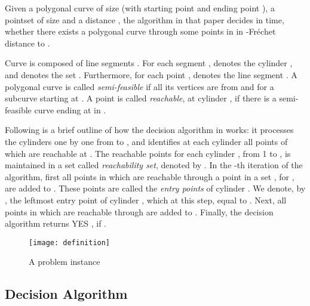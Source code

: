\documentclass[a4paper,UKenglish]{lipics}
\newcommand{\Frechet}{Fr\'echet }
\begin{document}
\vspace{0.3 in}

Given a polygonal curve  of size  (with 
starting point  and ending point ), 
a pointset  of size 
and a distance , 
the algorithm in that paper decides in  time,
whether there exists a polygonal curve through some points 
in  in -\Frechet distance to 
. 

Curve  is composed of  
line segments . 
For each segment ,
 denotes the cylinder ,
and  denotes the set .
Furthermore, for each point ,
  denotes the line segment  \cite{cccg11}.
A polygonal curve  is called \emph{semi-feasible} if all its vertices are from  and 
 for a subcurve   starting at .
A point  is called \emph{reachable}, at cylinder ,
if there is a semi-feasible curve ending at  in .


Following is a brief outline of how the decision 
algorithm in \cite{cccg11} works: 
it processes the cylinders one by one from 
 to , and identifies at each cylinder 
all points of  which are reachable at .
The reachable points for each cylinder ,  from 1 to , is maintained in a set
called {\em reachability set}, denoted by .
In the -th iteration of the algorithm,
first all points in 
which are reachable through a point in a set 
, for , are added to  .
These points are called the \emph{entry points} of cylinder . 
We denote, by , the leftmost 
entry point of cylinder , which 
at this step, equal to .
Next,  all points in 
which are reachable through 
are added to .
Finally, the decision algorithm 
returns YES , if  
.





















 




\begin{figure}[t]
	\centering
	\texttt{[image: definition]}
	\caption{A problem instance}
	\label{fig:types}
\end{figure}


\subsection {Decision Algorithm}\label{subsec:decAlg}
\end{document}
